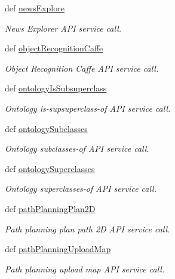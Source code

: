 \begin{DoxyCompactItemize}
def \hyperlink{classRappCloud_1_1RappPlatformApi_1_1RappPlatformAPI_addb45bb4a87bc82b2b60f7843985c117}{news\-Explore}
\begin{DoxyCompactList}\small\item\em News Explorer A\-P\-I service call. \end{DoxyCompactList}\item 
def \hyperlink{classRappCloud_1_1RappPlatformApi_1_1RappPlatformAPI_a2b0eaf074bc74a031c760948286fdcc6}{object\-Recognition\-Caffe}
\begin{DoxyCompactList}\small\item\em Object Recognition Caffe A\-P\-I service call. \end{DoxyCompactList}\item 
def \hyperlink{classRappCloud_1_1RappPlatformApi_1_1RappPlatformAPI_af7aede29ccef786ab1d0b6b888efd6eb}{ontology\-Is\-Subsuperclass}
\begin{DoxyCompactList}\small\item\em Ontology is-\/supsuperclass-\/of A\-P\-I service call. \end{DoxyCompactList}\item 
def \hyperlink{classRappCloud_1_1RappPlatformApi_1_1RappPlatformAPI_a869c45bf7319d1bd54e3bc2a32d956e2}{ontology\-Subclasses}
\begin{DoxyCompactList}\small\item\em Ontology subclasses-\/of A\-P\-I service call. \end{DoxyCompactList}\item 
def \hyperlink{classRappCloud_1_1RappPlatformApi_1_1RappPlatformAPI_a59d904f114b092b0198154db281845d8}{ontology\-Superclasses}
\begin{DoxyCompactList}\small\item\em Ontology superclasses-\/of A\-P\-I service call. \end{DoxyCompactList}\item 
def \hyperlink{classRappCloud_1_1RappPlatformApi_1_1RappPlatformAPI_a36e2b67e2af9d532176b00df5c122390}{path\-Planning\-Plan2\-D}
\begin{DoxyCompactList}\small\item\em Path planning plan path 2\-D A\-P\-I service call. \end{DoxyCompactList}\item 
def \hyperlink{classRappCloud_1_1RappPlatformApi_1_1RappPlatformAPI_ae60db2a3657b3215c9bf721b8ffe7703}{path\-Planning\-Upload\-Map}
\begin{DoxyCompactList}\small\item\em Path planning upload map A\-P\-I service call. \end{DoxyCompactList}\item 

\end{DoxyCompactItemize}
